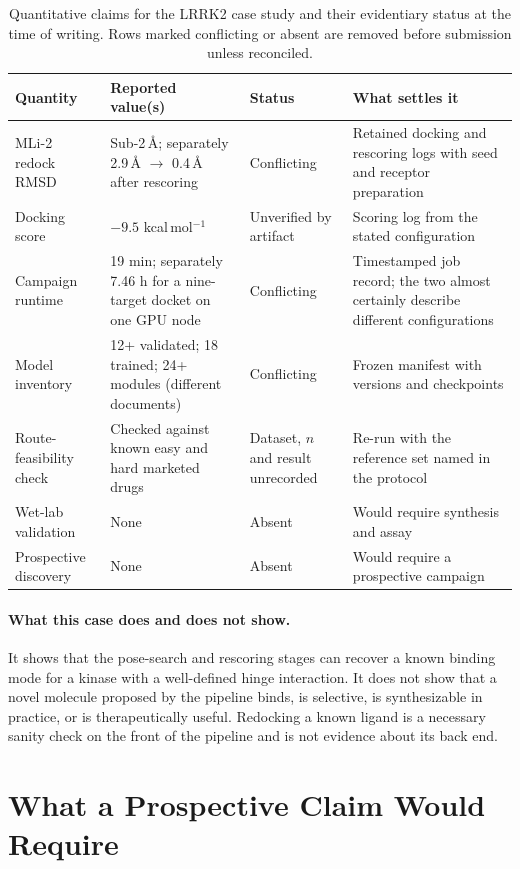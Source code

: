 \documentclass[10pt,twocolumn]{article}
\begin{document}
\begin{table}[t]
\centering
\small
\begin{tabular}{@{}p{3.6cm}p{4.4cm}p{4.0cm}p{3.8cm}@{}}
\toprule
\textbf{Quantity} & \textbf{Reported value(s)} & \textbf{Status} & \textbf{What settles it} \\
\midrule
MLi-2 redock RMSD & Sub-2\,\AA{}; separately 2.9\,\AA{} $\rightarrow$
0.4\,\AA{} after rescoring & Conflicting & Retained docking and rescoring logs
with seed and receptor preparation \\
Docking score & $-9.5$ kcal\,mol$^{-1}$ & Unverified by artifact &
Scoring log from the stated configuration \\
Campaign runtime & 19 min; separately 7.46 h for a nine-target docket on one
GPU node & Conflicting & Timestamped job record; the two almost certainly
describe different configurations \\
Model inventory & 12+ validated; 18 trained; 24+ modules (different documents)
& Conflicting & Frozen manifest with versions and checkpoints \\
Route-feasibility check & Checked against known easy and hard marketed drugs
& Dataset, $n$ and result unrecorded & Re-run with the reference set named in
the protocol \\
Wet-lab validation & None & Absent & Would require synthesis and assay \\
Prospective discovery & None & Absent & Would require a prospective campaign \\
\bottomrule
\end{tabular}
\caption{Quantitative claims for the LRRK2 case study and their evidentiary
status at the time of writing. Rows marked conflicting or absent are removed
before submission unless reconciled.}
\label{tab:status}
\end{table}

\paragraph{What this case does and does not show.} It shows that the pose-search
and rescoring stages can recover a known binding mode for a kinase with a
well-defined hinge interaction. It does not show that a novel molecule proposed
by the pipeline binds, is selective, is synthesizable in practice, or is
therapeutically useful. Redocking a known ligand is a necessary sanity check on
the front of the pipeline and is not evidence about its back end.

\section{What a Prospective Claim Would Require}
\label{sec:evaluation}
\end{document}

